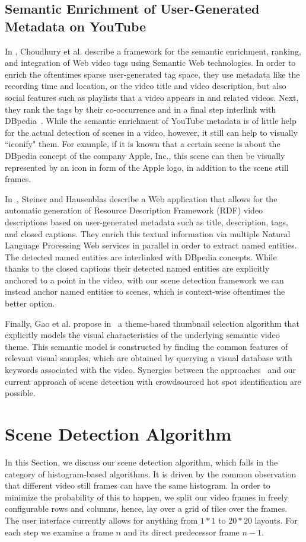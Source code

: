 \documentclass[10pt,twocolumn,letterpaper]{article}
\begin{document}
\subsection{Semantic Enrichment of User-Generated Metadata on YouTube}
In \cite{Choudhury:YouTube}, Choudhury et al. describe a framework for the semantic enrichment, ranking, and integration of Web video tags using Semantic Web technologies. In order to enrich the oftentimes sparse user-generated tag space, they use metadata like the recording time and location, or the video title and video description, but also social features such as playlists that a video appears in and related videos. Next, they rank the tags by their co-occurrence and in a final step interlink with DBpedia~\cite{Bizer:DBpedia}. While the semantic enrichment of YouTube metadata is of little help for the actual detection of scenes in a video, however, it still can help to visually ``iconify" them. For example, if it is known that a certain scene is about the DBpedia concept of the company Apple, Inc., this scene can then be visually represented by an icon in form of the Apple logo, in addition to the scene still frames.

In~\cite{semwebvid}, Steiner and Hausenblas describe a Web application that allows for the automatic generation of Resource Description Framework (RDF) video descriptions based on user-generated metadata such as title, description, tags, and closed captions. They enrich this textual information via multiple Natural Language Processing Web services in parallel in order to extract named entities. The detected named entities are interlinked with DBpedia concepts. While thanks to the closed captions their detected named entities are explicitly anchored to a point in the video, with our scene detection framework we can instead anchor named entities to scenes, which is context-wise oftentimes the better option.

Finally, Gao et al. propose in~\cite{Gao:2009} a theme-based thumbnail selection algorithm that explicitly models the visual characteristics of the underlying semantic video theme. This semantic model is constructed by finding the common features of relevant visual samples, which are obtained by querying a visual database with keywords associated with the video. Synergies between the approaches~\cite{Choudhury:YouTube,Gao:2009,semwebvid} and our current approach of scene detection with crowdsourced hot spot identification are possible.

\section{Scene Detection Algorithm} \label{sec:details-of-algo}
In this Section, we discuss our scene detection algorithm, which falls in the category of histogram-based algorithms.  It is driven by the common observation that different video still frames can have the same histogram. In order to minimize the probability of this to happen, we split our video frames in freely configurable rows and columns, hence, lay over a grid of tiles over the frames. The user interface currently allows for anything from $1 * 1$ to $20 * 20$ layouts. For each step we examine a frame $n$ and its direct predecessor frame $n - 1$.
\end{document}
